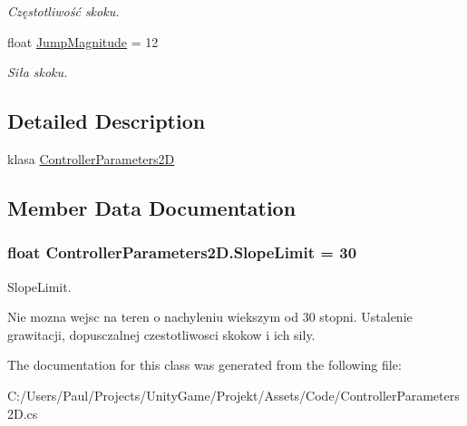 \begin{DoxyCompactItemize}
\begin{DoxyCompactList}\small\item\em Częstotliwość skoku. \end{DoxyCompactList}\item 
\hypertarget{class_controller_parameters2_d_ae92dcce1c474adc687bcfa45ca02ae27}{}float \hyperlink{class_controller_parameters2_d_ae92dcce1c474adc687bcfa45ca02ae27}{Jump\+Magnitude} = 12\label{class_controller_parameters2_d_ae92dcce1c474adc687bcfa45ca02ae27}

\begin{DoxyCompactList}\small\item\em Siła skoku. \end{DoxyCompactList}\end{DoxyCompactItemize}


\subsection{Detailed Description}
klasa \hyperlink{class_controller_parameters2_d}{Controller\+Parameters2\+D} 



\subsection{Member Data Documentation}
\hypertarget{class_controller_parameters2_d_ae706235bff2d67da0d71293bef2ea8d1}{}
\subsubsection[{Slope\+Limit}]{\setlength{\rightskip}{0pt plus 5cm}float Controller\+Parameters2\+D.\+Slope\+Limit = 30}\label{class_controller_parameters2_d_ae706235bff2d67da0d71293bef2ea8d1}


Slope\+Limit. 

Nie mozna wejsc na teren o nachyleniu wiekszym od 30 stopni. Ustalenie grawitacji, dopusczalnej czestotliwosci skokow i ich sily. 

The documentation for this class was generated from the following file\+:\begin{DoxyCompactItemize}
\item 
C\+:/\+Users/\+Paul/\+Projects/\+Unity\+Game/\+Projekt/\+Assets/\+Code/Controller\+Parameters2\+D.\+cs\end{DoxyCompactItemize}
